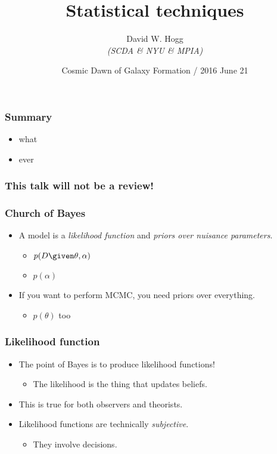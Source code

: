 \documentclass[pdftex]{beamer}
\title{Statistical techniques}
\author[David W. Hogg (NYU)]{David W. Hogg\\[1ex] {\small \textsl{(SCDA \& NYU \& MPIA)}}}
\date{Cosmic Dawn of Galaxy Formation / 2016 June 21}
\newcommand{\conclusions}{%
\begin{frame}
  \frametitle{Summary}
  \begin{itemize}
  \item what
  \item ever
  \end{itemize}
\end{frame}}
\begin{document}
\begin{frame}
  \titlepage
\end{frame}

\conclusions

\begin{frame}
  \frametitle{This talk will not be a review!}
\end{frame}

\begin{frame}
  \frametitle{Church of Bayes}
  \begin{itemize}
  \item A model is a \emph{likelihood function} and \emph{priors over nuisance parameters}.
    \begin{itemize}
    \item $p(D\given\theta,\alpha)$
    \item $p(\alpha)$
    \end{itemize}
  \item If you want to perform MCMC, you need priors over everything.
    \begin{itemize}
    \item $p(\theta)$ too
    \end{itemize}
  \end{itemize}
\end{frame}

\begin{frame}
  \frametitle{Likelihood function}
  \begin{itemize}
  \item The point of Bayes is to produce likelihood functions!
    \begin{itemize}
    \item The likelihood is the thing that updates beliefs.
    \end{itemize}
  \item This is true for both observers and theorists.
  \item Likelihood functions are technically \emph{subjective}.
    \begin{itemize}
    \item They involve decisions.
    \end{itemize}
  \end{itemize}
\end{frame}
\end{document}
